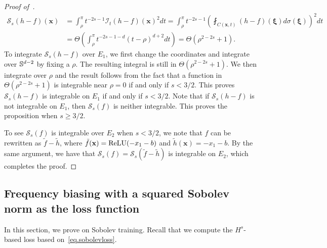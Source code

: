 \begin{proof}[Proof of~]
\begin{align*}
    \mathcal{S}_s(h-f)(\mathbf{x}) &= \int_\rho^\pi t^{-2s-1} \mathcal{I}_t(h-f)(\mathbf{x})^2 dt = \int_\rho^\pi t^{-2s-1} \left(\fint_{C(\mathbf{x},t)} (h-f)(\boldsymbol{\xi}) d\sigma(\boldsymbol{\xi})\right)^2 dt \\
    &= \Theta\left(\int_\rho^\pi t^{-2s-1-d} (t-\rho)^{d+2} dt\right) = \Theta(\rho^{2-2s}+1).
\end{align*}
To integrate $\mathcal{S}_s(h-f)$ over $E_1$, we first change the coordinates and integrate over ${\mathbb{S}}^{d-2}$ by fixing a $\rho$. The resulting integral is still in $\Theta(\rho^{2-2s}+1)$. We then integrate over $\rho$ and the result follows from the fact that a function in $\Theta(\rho^{2-2s}+1)$ is integrable near $\rho = 0$ if and only if $s < 3/2$. This proves $\mathcal{S}_s(h-f)$ is integrable on $E_1$ if and only if $s < 3/2$. Note that if $\mathcal{S}_s(h-f)$ is not integrable on $E_1$, then $\mathcal{S}_s(f)$ is neither integrable. This proves the proposition when $s \geq 3/2$. %

To see $\mathcal{S}_s(f)$ is integrable over $E_2$ when $s < 3/2$, we note that $f$ can be rewritten as $\tilde{f} - \tilde{h}$, where $\tilde{f}(\mathbf{x}) = {\rm ReLU}(-x_1 - b)$ and $\tilde{h}(\mathbf{x}) = -x_1 - b$. By the same argument, we have that $\mathcal{S}_s(f) = \mathcal{S}_s(\tilde{f} - \tilde{h})$ is integrable on $E_2$, which completes the proof.
\end{proof}

\subsection{Frequency biasing with a squared Sobolev norm as the loss function}

In this section, we prove  on Sobolev training. Recall that we compute the $H^s$-based loss based on~\cref{eq.sobolevloss}.



